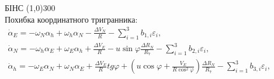 \documentclass[ucs,compress]{beamer}    %
\begin{document}
\begin{frame}[plain]
\begin{block}{БІНС}
{\centering \line(1,0){300}\\}
Похибка координатного тригранника:\\
$\label{eq:dasdins} \begin{array}{l} 
{\dot{\alpha }_{E} =-\omega_{N} \alpha_{h} +\omega_{h} \alpha_{N} -\frac{\Delta V_{N} }{R} -\sum_{i=1}^{3}b_{1,i}\varepsilon_{i} ,} \\
{\dot{\alpha }_{N} =-\omega_{h} \alpha_{E} +\omega_{E} \alpha_{h} +\frac{\Delta V_{E} }{R} -u\sin \varphi \frac{\Delta R_{N} }{R_{7} }
-\sum_{i=1}^{3}b_{2,i}  \varepsilon_{i} ,} \\ 
{\dot{\alpha }_{h} =-\omega_{E} \alpha_{N} +\omega_{N} \alpha_{E} +\frac{\Delta V_{E} }{R} tg\varphi +(u\cos \varphi +\frac{V_{E} }{R\cos ^{2} \varphi } )
\frac{\Delta R_{N} }{R_{7} } -\sum_{i=1}^{3}b_{3,i}\varepsilon_{i} ,} \end{array} $
\end{block}
\end{frame}

\end{document}
